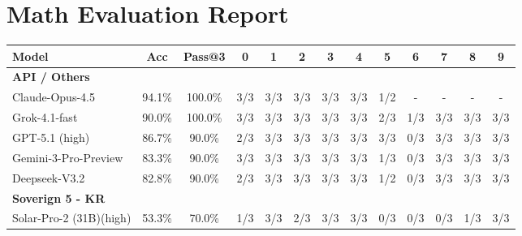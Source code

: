 \documentclass{article}
\begin{document}
\section*{Math Evaluation Report}

\begin{table}[h!]
\centering
\small
\begin{tabular}{l c c cccccccccc}
\toprule
\textbf{Model} & \textbf{Acc} & \textbf{Pass@3}  & \textbf{0} & \textbf{1} & \textbf{2} & \textbf{3} & \textbf{4} & \textbf{5} & \textbf{6} & \textbf{7} & \textbf{8} & \textbf{9} \\
\midrule
\multicolumn{13}{l}{\textbf{API / Others}} \\
\midrule
Claude-Opus-4.5 & 94.1\% & 100.0\% & \cellcolor{score3} 3/3 & \cellcolor{score3} 3/3 & \cellcolor{score3} 3/3 & \cellcolor{score3} 3/3 & \cellcolor{score3} 3/3 & \cellcolor{score1} 1/2 & - & - & - & - \\
Grok-4.1-fast & 90.0\% & 100.0\% & \cellcolor{score3} 3/3 & \cellcolor{score3} 3/3 & \cellcolor{score3} 3/3 & \cellcolor{score3} 3/3 & \cellcolor{score3} 3/3 & \cellcolor{score2} 2/3 & \cellcolor{score1} 1/3 & \cellcolor{score3} 3/3 & \cellcolor{score3} 3/3 & \cellcolor{score3} 3/3 \\
GPT-5.1 (high)& 86.7\% & 90.0\% & \cellcolor{score2} 2/3 & \cellcolor{score3} 3/3 & \cellcolor{score3} 3/3 & \cellcolor{score3} 3/3 & \cellcolor{score3} 3/3 & \cellcolor{score3} 3/3 & \cellcolor{score0} 0/3 & \cellcolor{score3} 3/3 & \cellcolor{score3} 3/3 & \cellcolor{score3} 3/3 \\
Gemini-3-Pro-Preview & 83.3\% & 90.0\% & \cellcolor{score3} 3/3 & \cellcolor{score3} 3/3 & \cellcolor{score3} 3/3 & \cellcolor{score3} 3/3 & \cellcolor{score3} 3/3 & \cellcolor{score1} 1/3 & \cellcolor{score0} 0/3 & \cellcolor{score3} 3/3 & \cellcolor{score3} 3/3 & \cellcolor{score3} 3/3 \\
Deepseek-V3.2 & 82.8\% & 90.0\% & \cellcolor{score2} 2/3 & \cellcolor{score3} 3/3 & \cellcolor{score3} 3/3 & \cellcolor{score3} 3/3 & \cellcolor{score3} 3/3 & \cellcolor{score1} 1/2 & \cellcolor{score0} 0/3 & \cellcolor{score3} 3/3 & \cellcolor{score3} 3/3 & \cellcolor{score3} 3/3 \\
\midrule
\multicolumn{13}{l}{\textbf{Soverign 5 - KR}} \\
\midrule
Solar-Pro-2 (31B)(high) & 53.3\% & 70.0\% & \cellcolor{score1} 1/3 & \cellcolor{score3} 3/3 & \cellcolor{score2} 2/3 & \cellcolor{score3} 3/3 & \cellcolor{score3} 3/3 & \cellcolor{score0} 0/3 & \cellcolor{score0} 0/3 & \cellcolor{score0} 0/3 & \cellcolor{score1} 1/3 & \cellcolor{score3} 3/3 \\

\end{tabular}
\end{table}
\end{document}
